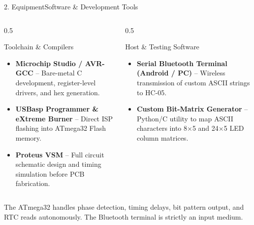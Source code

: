 \documentclass[aspectratio=169, 10pt]{beamer}
\begin{document}
\begin{frame}{2. Equipment}{Software \& Development Tools}
    \begin{columns}[T]
        \begin{column}{0.5\textwidth}
            \begin{block}{Toolchain \& Compilers}
                \small
                \begin{itemize}
                    \item \textbf{Microchip Studio / AVR-GCC} -- Bare-metal C development, register-level drivers, and hex generation.
                    \item \textbf{USBasp Programmer \& eXtreme Burner} -- Direct ISP flashing into ATmega32 Flash memory.
                    \item \textbf{Proteus VSM} -- Full circuit schematic design and timing simulation before PCB fabrication.
                \end{itemize}
            \end{block}
        \end{column}
        \begin{column}{0.5\textwidth}
            \begin{block}{Host \& Testing Software}
                \small
                \begin{itemize}
                    \item \textbf{Serial Bluetooth Terminal (Android / PC)} -- Wireless transmission of custom ASCII strings to HC-05.
                    \item \textbf{Custom Bit-Matrix Generator} -- Python/C utility to map ASCII characters into 8$\times$5 and 24$\times$5 LED column matrices.
                \end{itemize}
            \end{block}
        \end{column}
    \end{columns}
    \vspace{0.2cm}
    \footnotesize\color{Dim} The ATmega32 handles phase detection, timing delays, bit pattern output, and RTC reads autonomously. The Bluetooth terminal is strictly an input medium.
\end{frame}
\end{document}
